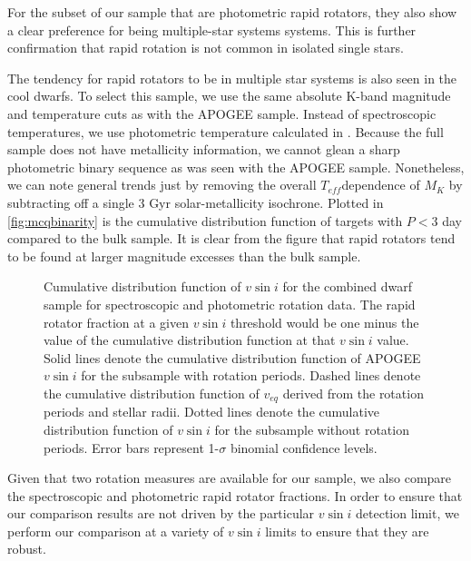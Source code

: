 \documentclass[manuscript]{aastex6}
\newcommand{\vsini}{\ensuremath{v \sin i}}
\newcommand{\Teff}{\ensuremath{T_{eff}}}
\begin{document}
For the subset of our sample that are photometric rapid rotators, they
also show a clear preference for being multiple-star systems systems.
This is further confirmation that rapid rotation is not common in
isolated single stars.

The tendency for rapid rotators to be in multiple star systems is also
seen in the \citet{McQuillan14} cool dwarfs. To select this sample, we
use the same absolute K-band magnitude and temperature cuts as with the
APOGEE sample. Instead of spectroscopic temperatures, we use photometric 
temperature calculated in \citet{Mathur17}. Because the full \citet{McQuillan14} 
sample does not have metallicity information, we cannot glean a sharp
photometric binary sequence as was seen with the APOGEE sample. Nonetheless,
we can note general trends just by removing the overall \Teff dependence of
\(M_K\) by subtracting off  a single 3 Gyr solar-metallicity
isochrone. Plotted in \cref{fig:mcqbinarity} is the cumulative distribution
function of \citet{McQuillan14} targets with \(P < 3\) day compared to the bulk
sample. It is clear from the figure that rapid rotators tend to be found at
larger magnitude excesses than the bulk sample.

\begin{figure}[htb]
    \caption{Cumulative distribution function of \vsini{} for the combined
        dwarf sample for spectroscopic and photometric rotation data. The 
        rapid rotator fraction at a given \vsini{} threshold
    would be one minus the value of the cumulative distribution function
    at that \vsini{} value. Solid lines denote the cumulative
    distribution function of APOGEE \vsini{} for the subsample with rotation
    periods. Dashed lines denote  
    the cumulative distribution function of \(v_{eq}\) derived from the
    rotation periods and stellar radii. Dotted lines denote the
    cumulative distribution function of \vsini{} for the subsample without
    rotation periods. Error bars represent 
    1-\(\sigma\) binomial confidence levels.\label{fig:detection_fraction}}
\end{figure}

Given that two rotation measures are available for our sample, we also compare 
the spectroscopic and photometric rapid rotator fractions. In order to
ensure that our comparison results are not driven by the particular
\vsini{} detection limit, we perform our comparison at a variety of
\vsini{} limits to ensure that they are robust.
\end{document}
